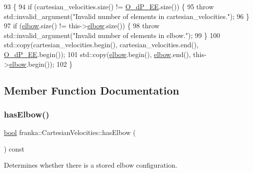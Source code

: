 \begin{DoxyCode}
93                                                                             \{
94   \textcolor{keywordflow}{if} (cartesian\_velocities.size() != \hyperlink{classfranka_1_1CartesianVelocities_ab7a42c7c1ee7109025aff5c43a56b398}{O\_dP\_EE}.size()) \{
95     \textcolor{keywordflow}{throw} std::invalid\_argument(\textcolor{stringliteral}{"Invalid number of elements in cartesian\_velocities."});
96   \}
97   \textcolor{keywordflow}{if} (\hyperlink{classfranka_1_1CartesianVelocities_a6419df1399d3dfab79b1654b94ced344}{elbow}.size() != this->\hyperlink{classfranka_1_1CartesianVelocities_a6419df1399d3dfab79b1654b94ced344}{elbow}.size()) \{
98     \textcolor{keywordflow}{throw} std::invalid\_argument(\textcolor{stringliteral}{"Invalid number of elements in elbow."});
99   \}
100   std::copy(cartesian\_velocities.begin(), cartesian\_velocities.end(), \hyperlink{classfranka_1_1CartesianVelocities_ab7a42c7c1ee7109025aff5c43a56b398}{O\_dP\_EE}.begin());
101   std::copy(\hyperlink{classfranka_1_1CartesianVelocities_a6419df1399d3dfab79b1654b94ced344}{elbow}.begin(), \hyperlink{classfranka_1_1CartesianVelocities_a6419df1399d3dfab79b1654b94ced344}{elbow}.end(), this->\hyperlink{classfranka_1_1CartesianVelocities_a6419df1399d3dfab79b1654b94ced344}{elbow}.begin());
102 \}
\end{DoxyCode}


\subsection{Member Function Documentation}
\mbox{\label{classfranka_1_1CartesianVelocities_a51a41893b10250982597fe367abb2ca6}} 
\subsubsection{\texorpdfstring{has\+Elbow()}{hasElbow()}}
{\footnotesize\ttfamily \hyperlink{classbool}{bool} franka\+::\+Cartesian\+Velocities\+::has\+Elbow (\begin{DoxyParamCaption}{ }\end{DoxyParamCaption}) const\hspace{0.3cm}{\ttfamily [noexcept]}}

Determines whether there is a stored elbow configuration.

